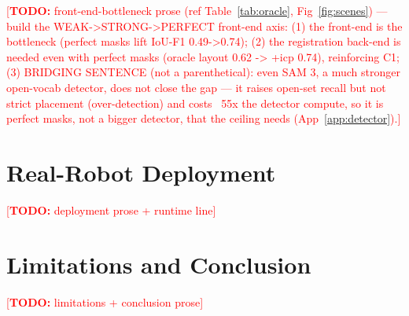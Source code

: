 \documentclass[conference]{IEEEtran}
\newcommand{\todo}[1]{\textcolor{red}{[\textbf{TODO:} #1]}}
\begin{document}
\todo{front-end-bottleneck prose (ref Table~\ref{tab:oracle}, Fig~\ref{fig:scenes}) --- build the WEAK->STRONG->PERFECT front-end axis: (1) the front-end is the bottleneck (perfect masks lift IoU-F1 0.49->0.74); (2) the registration back-end is needed even with perfect masks (oracle layout 0.62 -> +icp 0.74), reinforcing C1; (3) BRIDGING SENTENCE (not a parenthetical): even SAM 3, a much stronger open-vocab detector, does not close the gap --- it raises open-set recall but not strict placement (over-detection) and costs ~55x the detector compute, so it is perfect masks, not a bigger detector, that the ceiling needs (App~\ref{app:detector}).}

\section{Real-Robot Deployment}

\todo{deployment prose + runtime line}

\section{Limitations and Conclusion}

\todo{limitations + conclusion prose}

\appendix
\end{document}
